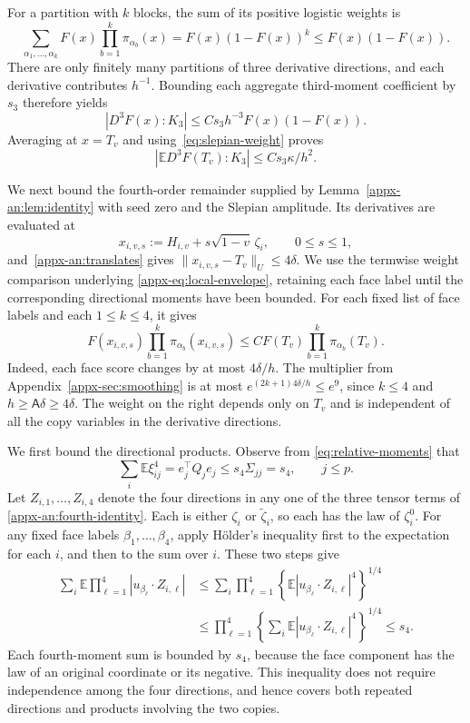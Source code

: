 \documentclass[11pt,letterpaper,twoside,leqno]{article}
\theoremstyle{bookplain}
\theoremstyle{bookremark}
\newcommand{\E}{\mathbb E}
\begin{document}
For a partition with \(k\) blocks, the sum of its positive logistic
weights is
\[
 \sum_{\alpha_1,\ldots,\alpha_k}
       F(x)\prod_{b=1}^k\pi_{\alpha_b}(x)
 =F(x)(1-F(x))^k
 \le F(x)(1-F(x)).
\]
There are only finitely many partitions of three derivative
directions, and each derivative contributes \(h^{-1}\).
Bounding each aggregate third-moment coefficient by \(s_3\)
therefore yields
\[
 |D^3F(x):K_3|\le Cs_3h^{-3}F(x)(1-F(x)).
\]
Averaging at \(x=T_v\) and using~\eqref{eq:slepian-weight} proves
\[
 |\E D^3F(T_v):K_3|\le Cs_3\kappa/h^2.
\]

We next bound the fourth-order remainder supplied by
Lemma~\ref{appx-an:lem:identity} with seed zero and the Slepian
amplitude. Its derivatives are evaluated at
\[
 x_{i,v,s}:=H_{i,v}+s\sqrt{1-v}\,\zeta_i,\qquad 0\le s\le1,
\]
and~\eqref{appx-an:translates} gives
\(\|x_{i,v,s}-T_v\|_U\le4\delta\).
We use the termwise weight comparison underlying
\eqref{appx-eq:local-envelope}, retaining each face label until
the corresponding directional moments have been bounded.
For each fixed list of face labels and each $1\le k\le4$, it gives
\[
 F(x_{i,v,s})\prod_{b=1}^k\pi_{\alpha_b}(x_{i,v,s})
 \le C F(T_v)\prod_{b=1}^k\pi_{\alpha_b}(T_v).
\]
Indeed, each face score changes by at most $4\delta/h$. The
multiplier from Appendix~\ref{appx-sec:smoothing} is at most
$e^{(2k+1)4\delta/h}\le e^9$, since $k\le4$ and
$h\ge\mathsf A\delta\ge4\delta$.
The weight on the right depends only on \(T_v\) and is
independent of all the copy variables in the derivative directions.

We first bound the directional products. Observe from
\eqref{eq:relative-moments} that
\[
 \sum_i\E\xi_{ij}^4=e_j^\top Q_j e_j
 \le s_4\Sigma_{jj}=s_4,\qquad j\le p.
\]
Let \(Z_{i,1},\ldots,Z_{i,4}\) denote the four directions in any
one of the three tensor terms of
\eqref{appx-an:fourth-identity}. Each is either \(\zeta_i\) or
\(\widetilde\zeta_i\), so each has the law of \(\zeta_i^0\).
For any fixed face labels $\beta_1,\ldots,\beta_4$, apply
H\"older's inequality first to the expectation for each $i$,
and then to the sum over $i$. These two steps give
\[
 \begin{aligned}
 \sum_i\E\prod_{\ell=1}^4
       |u_{\beta_\ell}\cdot Z_{i,\ell}|
 &\le\sum_i\prod_{\ell=1}^4
       \left\{\E
         |u_{\beta_\ell}\cdot Z_{i,\ell}|^4\right\}^{1/4}\\
 &\le\prod_{\ell=1}^4
       \left\{\sum_i\E
         |u_{\beta_\ell}\cdot Z_{i,\ell}|^4\right\}^{1/4}
 \le s_4.
 \end{aligned}
\]
Each fourth-moment sum is bounded by $s_4$, because the face
component has the law of an original coordinate or its negative.
This inequality does not require independence among the four
directions, and hence covers both repeated directions and products
involving the two copies.
\end{document}
